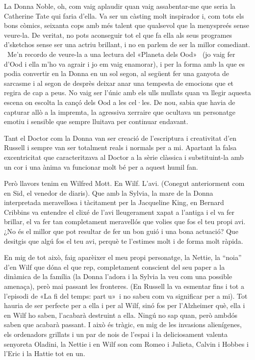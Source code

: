 La Donna Noble, oh, com vaig aplaudir quan vaig assabentar-me que seria
la Catherine Tate qui faria d'ella. Va ser un càsting molt inspirador i,
com tots els bons còmics, seixanta cops amb més talent que qualsevol que
la menyspreés sense veure-la. De veritat, no pots aconseguir tot el que
fa ella als seus programes d'sketchos sense ser una actriu brillant, i
no en parlem de ser la millor comediant. ~Me'n recordo de veure-la a una
lectura del «Planeta dels Ood»~ (jo vaig fer d'Ood i ella m'ho va agrair
i jo em vaig enamorar), i per la forma amb la que es podia convertir en
la Donna en un sol segon, al següent fer una ganyota de sarcasme i al
segon de desprès deixar anar una tempesta de emocions que et regira de
cap a peus. No vaig ser l'únic amb els ulls mullats quan va llegir
aquesta escena on escolta la cançó dels Ood a les cel·les. De nou, sabia
que havia de capturar allò a la impremta, la agressiva xerraire que
ocultava un personatge emotiu i sensible que sempre lluitava per
continuar endavant.

Tant el Doctor com la Donna van ser creació de l'escriptura i
creativitat d'en Russell i sempre van ser totalment reals i normals per
a mi. Apartant la falsa excentricitat que caracteritzava al Doctor a la
sèrie clàssica i substituint-la amb un cor i una ànima va funcionar molt
bé per a aquest humil fan.

Però llavors tenim en Wilfred Mott. En Wilf. L'avi. (Conegut
anteriorment com en Sid, el venedor de diaris). Que amb la Sylvia, la
mare de la Donna interpretada meravellosa i tàcitament per la Jacqueline
King, en Bernard Cribbins va entendre el clixé de l'avi lleugerament
xapat a l'antiga i el va fer brillar, el va fer tan completament
meravellós que volies que fos el teu propi avi. ¿No és el millor que pot
resultar de fer un bon guió i una bona actuació? Que desitgis que algú
fos el teu avi, perquè te l'estimes molt i de forma molt ràpida.

En mig de tot això, faig aparèixer el meu propi personatge, la Nettie,
la ``noia'' d'en Wilf que dóna el que rep, completament conscient del
seu paper a la dinàmica de la família (la Donna l'adora i la Sylvia la
veu com una possible amenaça), però mai passant les fronteres. (En
Russell la va esmentar fins i tot a l'episodi de «La fi del temps: part
u»~i no sabeu com va significar per a mi). Tot hauria de ser perfecte
per a ella i per al Wilf, sinó fos per l'Alzheimer què, ella i en Wilf
ho saben, l'acabarà destruint a ella. Ningú no sap quan, però ambdós
saben que acabarà passant. I això és tràgic, en mig de les invasions
alienígenes, els ordenadors grillats i un par de nois de l'espai i la
deliciosament valenta senyoreta Oladini, la Nettie i en Wilf son com
Romeo i Julieta, Calvin i Hobbes i l'Eric i la Hattie tot en un.

